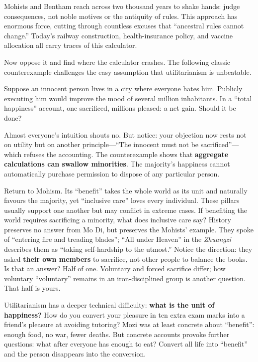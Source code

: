 Mohists and Bentham reach across two thousand years to shake hands: judge consequences, not noble motives or the antiquity of rules. This approach has enormous force, cutting through countless excuses that ``ancestral rules cannot change.'' Today's railway construction, health-insurance policy, and vaccine allocation all carry traces of this calculator.

Now oppose it and find where the calculator crashes. The following classic counterexample challenges the easy assumption that utilitarianism is unbeatable.

Suppose an innocent person lives in a city where everyone hates him. Publicly executing him would improve the mood of several million inhabitants. In a ``total happiness'' account, one sacrificed, millions pleased: a net gain. Should it be done?

Almost everyone's intuition shouts no. But notice: your objection now rests not on utility but on another principle---``The innocent must not be sacrificed''---which refuses the accounting. The counterexample shows that \textbf{aggregate calculations can swallow minorities}. The majority's happiness cannot automatically purchase permission to dispose of any particular person.

Return to Mohism. Its ``benefit'' takes the whole world as its unit and naturally favours the majority, yet ``inclusive care'' loves every individual. These pillars usually support one another but may conflict in extreme cases. If benefiting the world requires sacrificing a minority, what does inclusive care say? History preserves no answer from Mo Di, but preserves the Mohists' example. They spoke of ``entering fire and treading blades''; ``All under Heaven'' in the \textit{Zhuangzi} describes them as ``taking self-hardship to the utmost.'' Notice the direction: they asked \textbf{their own members} to sacrifice, not other people to balance the books. Is that an answer? Half of one. Voluntary and forced sacrifice differ; how voluntary ``voluntary'' remains in an iron-disciplined group is another question. That half is yours.

Utilitarianism has a deeper technical difficulty: \textbf{what is the unit of happiness?} How do you convert your pleasure in ten extra exam marks into a friend's pleasure at avoiding tutoring? Mozi was at least concrete about ``benefit'': enough food, no war, fewer deaths. But concrete accounts provoke further questions: what after everyone has enough to eat? Convert all life into ``benefit'' and the person disappears into the conversion.

